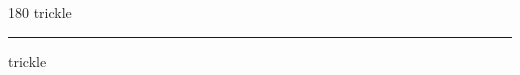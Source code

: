 
\begin{frame}
\begin{center}
\begin{turn}{180}
{\fontsize{2.5cm}{1em}\selectfont trickle}
\end{turn}
\vspace{1em}\par  
\hrule
\vspace{1em}\par  
{\fontsize{2.5cm}{1em}\selectfont trickle}
\end{center}
\end{frame}
